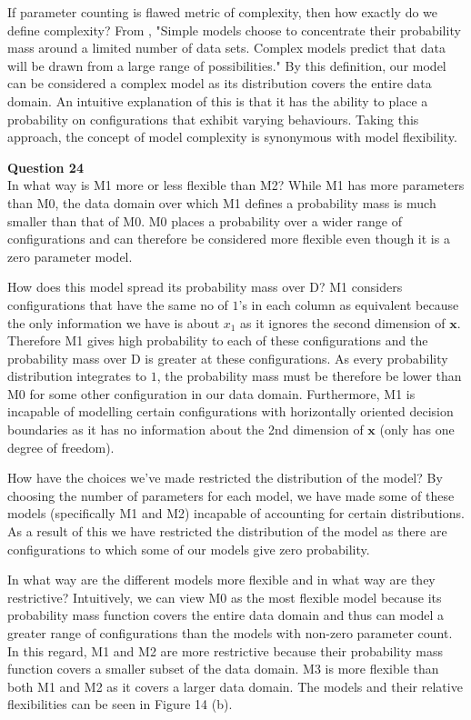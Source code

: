 \documentclass[10pt, a4paper, twocolumn]{article} %
\begin{document}
\begin{enumerate}
  If parameter counting is flawed metric of complexity, then how exactly do we define complexity? From \cite{murray2005note}, "Simple models choose to concentrate their probability mass around a limited number of data sets. Complex models predict that data will be drawn from a large range of possibilities." By this definition, our model can be considered a complex model as its distribution covers the entire data domain. An intuitive explanation of this is that it has the ability to place a probability on configurations that exhibit varying behaviours. Taking this approach, the concept of model complexity is synonymous with model flexibility.
  
  \textbf{Question 24}\\

  In what way is M1 more or less flexible than M2?
  While M1 has more parameters than M0, the data domain over which M1 defines a probability mass is much smaller than that of M0. M0 places a probability over a wider range of configurations and can therefore be considered more flexible even though it is a zero parameter model. 
  
  How does this model spread its probability mass over D?
  M1 considers configurations that have the same no of $1$'s in each column as equivalent because the only information we have is about $x_1$ as it ignores the second dimension of $\mathbf{x}$. Therefore M1 gives high probability to each of these configurations and the probability mass over D is greater at these configurations. As every probability distribution integrates to $1$, the probability mass must be therefore be lower than M0 for some other configuration in our data domain. Furthermore, M1 is incapable of modelling certain configurations with horizontally oriented decision boundaries as it has no information about the 2nd dimension of $\mathbf{x}$ (only has one degree of freedom).
  
  How have the choices we've made restricted the distribution of the model?
  By choosing the number of parameters for each model, we have made some of these models (specifically M1 and M2) incapable of accounting for certain distributions. As a result of this we have restricted the distribution of the model as there are configurations to which some of our models give zero probability.
  
  In what way are the different models more flexible and in what way are they restrictive? Intuitively, we can view M0 as the most flexible model because its probability mass function covers the entire data domain and thus can model a greater range of configurations than the models with non-zero parameter count. In this regard, M1 and M2 are more restrictive because their probability mass function covers a smaller subset of the data domain. M3 is more flexible than both M1 and M2 as it covers a larger data domain. The models and their relative flexibilities can be seen in Figure 14 (b).
  

\end{enumerate}
\end{document}
